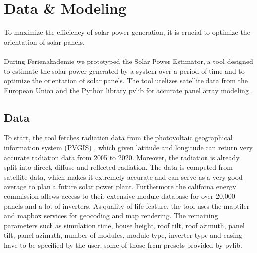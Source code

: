 \documentclass[12pt]{report}
\begin{document}
\section*{Data \& Modeling}
To maximize the efficiency of solar power generation, it is crucial to optimize the orientation of solar panels.
\\~\\
During Ferienakademie we prototyped the Solar Power Estimator, a tool designed to estimate the solar power generated by a system over a period of time and to optimize the orientation of solar panels.
The tool utelizes satellite data from the European Union and the Python library pvlib for accurate panel array modeling \cite{F.Holmgren.2018}.
\subsection*{Data}
To start, the tool fetches radiation data from the photovoltaic geographical information system (PVGIS) \cite{EnergyDGJointResearchCentre.2016}, which given latitude and longitude
can return very accurate radiation data from 2005 to 2020. Moreover, the radiation is already split into direct, diffuse and reflected radiation. The data is computed from satellite data, which makes it 
extremely accurate and can serve as a very good average to plan a future solar power plant. Furthermore the californa energy commission allows access to their extensive module database \cite{.02.10.2023} for over
20,000 panels and a lot of inverters. As quality of life feature, the tool uses the maptiler \cite{MapTilerAG.26.09.2023} and mapbox \cite{.02.10.2023b} services for geocoding and map rendering.
The remaining parameters such as simulation time, house height, roof tilt, roof azimuth, panel tilt, panel azimuth, number of modules, module type, inverter type and casing have to be specified by the user,
some of those from presets provided by pvlib.
\end{document}
